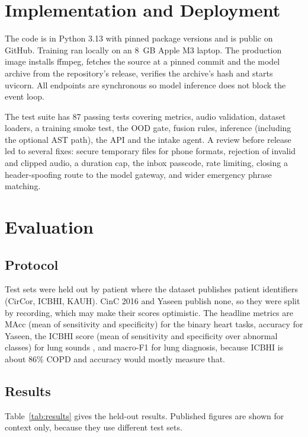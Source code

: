 \documentclass[conference]{IEEEtran}
\begin{document}
\section{Implementation and Deployment}
The code is in Python 3.13 with pinned package versions and is public on GitHub. Training ran locally on an 8~GB Apple M3 laptop. The production image installs ffmpeg, fetches the source at a pinned commit and the model archive from the repository's release, verifies the archive's hash and starts uvicorn. All endpoints are synchronous so model inference does not block the event loop.

The test suite has 87 passing tests covering metrics, audio validation, dataset loaders, a training smoke test, the OOD gate, fusion rules, inference (including the optional AST path), the API and the intake agent. A review before release led to several fixes: secure temporary files for phone formats, rejection of invalid and clipped audio, a duration cap, the inbox passcode, rate limiting, closing a header-spoofing route to the model gateway, and wider emergency phrase matching.

\section{Evaluation}

\subsection{Protocol}
Test sets were held out by patient where the dataset publishes patient identifiers (CirCor, ICBHI, KAUH). CinC 2016 and Yaseen publish none, so they were split by recording, which may make their scores optimistic. The headline metrics are MAcc (mean of sensitivity and specificity) for the binary heart tasks, accuracy for Yaseen, the ICBHI score (mean of sensitivity and specificity over abnormal classes) for lung sounds \cite{rocha2019}, and macro-F1 for lung diagnosis, because ICBHI is about 86\% COPD and accuracy would mostly measure that.

\subsection{Results}
Table~\ref{tab:results} gives the held-out results. Published figures are shown for context only, because they use different test sets.
\end{document}
